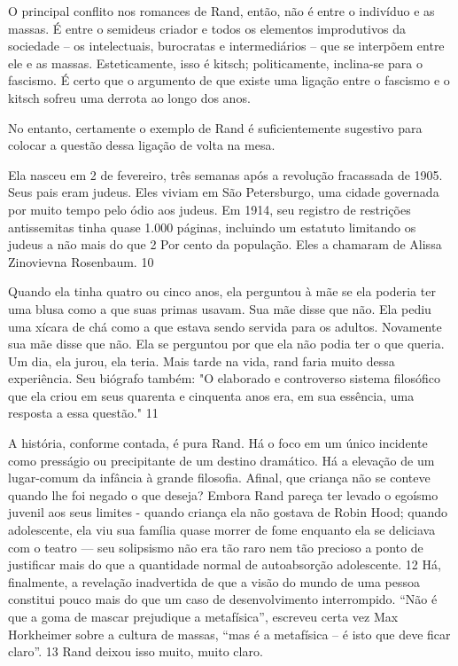  
\par
 
O principal conflito nos romances de Rand, então, não é entre o indivíduo e as massas. É entre o semideus criador e todos os elementos improdutivos da sociedade – os intelectuais, burocratas e intermediários – que se interpõem entre ele e as massas. Esteticamente, isso é kitsch; politicamente, inclina-se para o fascismo. É certo que o argumento de que existe uma ligação entre o fascismo e o kitsch sofreu uma derrota ao longo dos anos.
 
\par
 
No entanto, certamente o exemplo de Rand é suficientemente sugestivo para colocar a questão dessa ligação de volta na mesa.
 
\par
 
Ela nasceu em 2 de fevereiro, três semanas após a revolução fracassada de 1905. Seus pais eram judeus. Eles viviam em São Petersburgo, uma cidade governada por muito tempo pelo ódio aos judeus. Em 1914, seu registro de restrições antissemitas tinha quase 1.000 páginas, incluindo um estatuto limitando os judeus a não mais do que
 {\color{blue} 2}  
Por cento da população. Eles a chamaram de Alissa Zinovievna Rosenbaum.
 {\color{blue} 10}  

 
\par
 
Quando ela tinha quatro ou cinco anos, ela perguntou à mãe se ela poderia ter uma blusa como a que suas primas usavam. Sua mãe disse que não. Ela pediu uma xícara de chá como a que estava sendo servida para os adultos. Novamente sua mãe disse que não. Ela se perguntou por que ela não podia ter o que queria. Um dia, ela jurou, ela teria. Mais tarde na vida, rand faria muito dessa experiência. Seu biógrafo também: "O elaborado e controverso sistema filosófico que ela criou em seus quarenta e cinquenta anos era, em sua essência, uma resposta a essa questão."
 {\color{blue} 11}  

 
\par
 
A história, conforme contada, é pura Rand. Há o foco em um único incidente como presságio ou precipitante de um destino dramático. Há a elevação de um lugar-comum da infância à grande filosofia. Afinal, que criança não se conteve quando lhe foi negado o que deseja? Embora Rand pareça ter levado o egoísmo juvenil aos seus limites - quando criança ela não gostava de Robin Hood; quando adolescente, ela viu sua família quase morrer de fome enquanto ela se deliciava com o teatro — seu solipsismo não era tão raro nem tão precioso a ponto de justificar mais do que a quantidade normal de autoabsorção adolescente.
 {\color{blue} 12}  
Há, finalmente, a revelação inadvertida de que a visão do mundo de uma pessoa constitui pouco mais do que um caso de desenvolvimento interrompido. “Não é que a goma de mascar prejudique a metafísica”, escreveu certa vez Max Horkheimer sobre a cultura de massas, “mas é a metafísica – é isto que deve ficar claro”.
 {\color{blue} 13}  
Rand deixou isso muito, muito claro.
 
